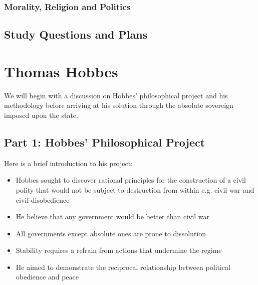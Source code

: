 \documentclass[12pt, letterpaper]{article}
\begin{document}
\subsubsection{Morality, Religion and Politics}


\subsection{Study Questions and Plans}

\newpage
\section{Thomas Hobbes}
We will begin with a discussion on Hobbes' philosophical project and his methodology before arriving at his solution through the absolute sovereign imposed upon the state.

\subsection{Part 1: Hobbes' Philosophical Project}
Here is a brief introduction to his project:
\begin{itemize}
	\item Hobbes sought to discover rational principles for the construction of a civil polity that would not be subject to destruction from within e.g. civil war and civil disobedience
	\item He believe that any government would be better than civil war
	\item All governments except absolute ones are prone to dissolution
	\item Stability requires a refrain from actions that undermine the regime
	\item He aimed to demonstrate the reciprocal relationship between political obedience and peace
\end{itemize}
\end{document}
